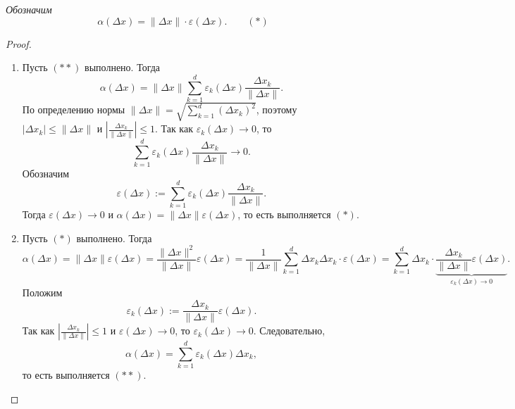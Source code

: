 \documentclass[12pt,a4paper]{report}
\begin{document}
\textit{Обозначим}
\[
\alpha(\Delta x)=\|\Delta x\|\cdot\varepsilon(\Delta x).\qquad (*)
\]



\begin{proof}
    \begin{enumerate}
        \item[$(**)\Longrightarrow(*)$]
        Пусть $(**)$ выполнено. Тогда
        \[
        \alpha(\Delta x)=\|\Delta x\|\sum_{k=1}^d\varepsilon_k(\Delta x)\frac{\Delta x_k}{\|\Delta x\|}.
        \]
        По определению нормы $\|\Delta x\|=\sqrt{\sum_{k=1}^d(\Delta x_k)^2}$, поэтому $|\Delta x_k|\leq\|\Delta x\|$ и $\left|\frac{\Delta x_k}{\|\Delta x\|}\right|\leq1$. Так как $\varepsilon_k(\Delta x)\to0$, то
        \[
        \sum_{k=1}^d\varepsilon_k(\Delta x)\frac{\Delta x_k}{\|\Delta x\|}\to0.
        \]
        Обозначим
        \[
        \varepsilon(\Delta x):=\sum_{k=1}^d\varepsilon_k(\Delta x)\frac{\Delta x_k}{\|\Delta x\|}.
        \]
        Тогда $\varepsilon(\Delta x)\to0$ и $\alpha(\Delta x)=\|\Delta x\|\varepsilon(\Delta x)$, то есть выполняется $(*)$.

        \item[$(*)\Longrightarrow(**)$]
        Пусть $(*)$ выполнено. Тогда
        \[
        \alpha(\Delta x)=\|\Delta x\|\varepsilon(\Delta x)
        =\frac{\|\Delta x\|^2}{\|\Delta x\|}\varepsilon(\Delta x)
        =\frac{1}{\|\Delta x\|}\sum_{k=1}^d\Delta x_k\Delta x_k\cdot\varepsilon(\Delta x)
        =\sum_{k=1}^d\Delta x_k\cdot
        \underbrace{\frac{\Delta x_k}{\|\Delta x\|}\varepsilon(\Delta x)}_{\varepsilon_k(\Delta x)\to0}.
        \]
        Положим
        \[
        \varepsilon_k(\Delta x):=\frac{\Delta x_k}{\|\Delta x\|}\varepsilon(\Delta x).
        \]
        Так как $\left|\frac{\Delta x_k}{\|\Delta x\|}\right|\leq1$ и $\varepsilon(\Delta x)\to0$, то $\varepsilon_k(\Delta x)\to0$. Следовательно,
        \[
        \alpha(\Delta x)=\sum_{k=1}^d\varepsilon_k(\Delta x)\Delta x_k,
        \]
        то есть выполняется $(**)$.
    \end{enumerate}
\end{proof}
\end{document}
